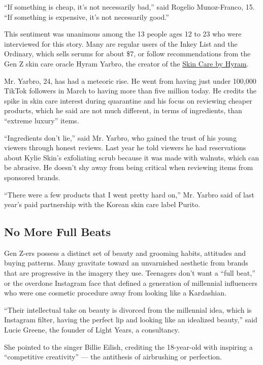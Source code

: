 ``If something is cheap, it's not necessarily bad,'' said Rogelio
Munoz-Franco, 15. ``If something is expensive, it's not necessarily
good.''

This sentiment was unanimous among the 13 people ages 12 to 23 who were
interviewed for this story. Many are regular users of the Inkey List and
the Ordinary, which sells serums for about \$7, or follow
recommendations from the Gen Z skin care oracle Hyram Yarbro, the
creator of the \href{https://www.skincarebyhyram.com/}{Skin Care by
Hyram}.

Mr. Yarbro, 24, has had a meteoric rise. He went from having just under
100,000 TikTok followers in March to having more than five million
today. He credits the spike in skin care interest during quarantine and
his focus on reviewing cheaper products, which he said are not much
different, in terms of ingredients, than ``extreme luxury'' items.

``Ingredients don't lie,'' said Mr. Yarbro, who gained the trust of his
young viewers through honest reviews. Last year he told viewers he had
reservations about Kylie Skin's exfoliating scrub because it was made
with walnuts, which can be abrasive. He doesn't shy away from being
critical when reviewing items from sponsored brands.

``There were a few products that I went pretty hard on,'' Mr. Yarbro
said of last year's paid partnership with the Korean skin care label
Purito.

\hypertarget{no-more-full-beats}{%
\subsection{No More Full Beats}\label{no-more-full-beats}}

Gen Z-ers possess a distinct set of beauty and grooming habits,
attitudes and buying patterns. Many gravitate toward an unvarnished
aesthetic from brands that are progressive in the imagery they use.
Teenagers don't want a ``full beat,'' or the overdone Instagram face
that defined a generation of millennial influencers who were one
cosmetic procedure away from looking like a Kardashian.

``Their intellectual take on beauty is divorced from the millennial
idea, which is Instagram filter, having the perfect lip and looking like
an idealized beauty,'' said Lucie Greene, the founder of Light Years, a
consultancy.

She pointed to the singer Billie Eilish, crediting the 18-year-old with
inspiring a ``competitive creativity'' --- the antithesis of airbrushing
or perfection.

